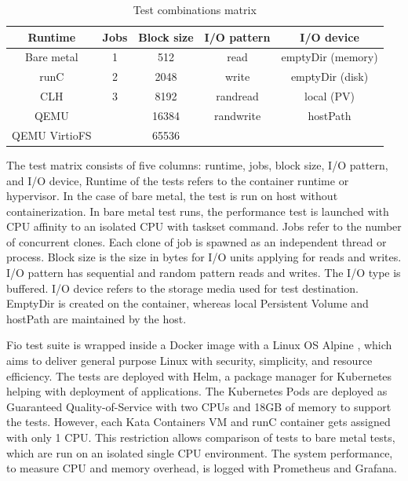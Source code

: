 \begin{table}[ht]
\centering
\caption{Test combinations matrix}
\vspace{\baselineskip}
\begin{tabular}{| c | c | c | c | c |}
\hline
\textbf{Runtime} & \textbf{Jobs} & \textbf{Block size} & \textbf{I/O pattern} & \textbf{I/O device} \\ 
\hline
Bare metal & 1 & 512 & read & emptyDir (memory) \\
\hline
runC & 2 & 2048 & write & emptyDir (disk) \\ 
\hline
CLH & 3 & 8192 & randread & local (PV) \\
\hline
QEMU & & 16384 & randwrite & hostPath \\
\hline
QEMU VirtioFS & & 65536 & & \\
\hline
\end{tabular}
\label{table:TestMatrix}
\end{table}

The test matrix consists of five columns: runtime, jobs, block size, I/O pattern, and I/O device, Runtime of the tests refers to the container runtime or hypervisor. In the case of bare metal, the test is run on host without containerization. In bare metal test runs, the performance test is launched with CPU affinity to an isolated CPU with taskset \cite{taskset} command. Jobs refer to the number of concurrent clones. Each clone of job is spawned as an independent thread or process. Block size is the size in bytes for I/O units applying for reads and writes. I/O pattern has sequential and random pattern reads and writes. The I/O type is buffered. I/O device refers to the storage media used for test destination. EmptyDir is created on the container, whereas local Persistent Volume and hostPath are maintained by the host.

Fio test suite is wrapped inside a Docker image with a Linux OS Alpine \cite{Alpine}, which aims to deliver general purpose Linux with security, simplicity, and resource efficiency. The tests are deployed with Helm\cite{Helm}, a package manager for Kubernetes helping with deployment of applications. The Kubernetes Pods are deployed as Guaranteed Quality-of-Service with two CPUs and 18GB of memory to support the tests. However, each Kata Containers VM and runC container gets assigned with only 1 CPU. This restriction allows comparison of tests to bare metal tests, which are run on an isolated single CPU environment. The system performance, to measure CPU and memory overhead, is logged with Prometheus and Grafana.

